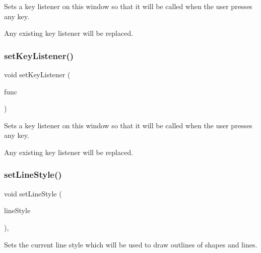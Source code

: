 Sets a key listener on this window so that it will be called when the user presses any key. 

Any existing key listener will be replaced. \mbox{\label{classsgl_1_1GWindow_ae48ecea73606c7bd9423e1c7cc589cc9}} 
\subsubsection{\texorpdfstring{set\+Key\+Listener()}{setKeyListener()}\hspace{0.1cm}{\footnotesize\ttfamily [2/2]}}
{\footnotesize\ttfamily void set\+Key\+Listener (\begin{DoxyParamCaption}\item[{\mbox{\hyperlink{namespacesgl_a54427ce97bb1c2804e4fe2b0a62e8b17}{G\+Event\+Listener\+Void}}}]{func }\end{DoxyParamCaption})\hspace{0.3cm}{\ttfamily [virtual]}}



Sets a key listener on this window so that it will be called when the user presses any key. 

Any existing key listener will be replaced. \mbox{\label{classsgl_1_1GDrawingSurface_a6bfe14a77101db0fb97b5a7e07a5526b}} 
\subsubsection{\texorpdfstring{set\+Line\+Style()}{setLineStyle()}}
{\footnotesize\ttfamily void set\+Line\+Style (\begin{DoxyParamCaption}\item[{\mbox{\hyperlink{classsgl_1_1GObject_a86e0f5648542856159bb40775c854aa7}{G\+Object\+::\+Line\+Style}}}]{line\+Style }\end{DoxyParamCaption})\hspace{0.3cm}{\ttfamily [virtual]}, {\ttfamily [inherited]}}



Sets the current line style which will be used to draw outlines of shapes and lines. 

